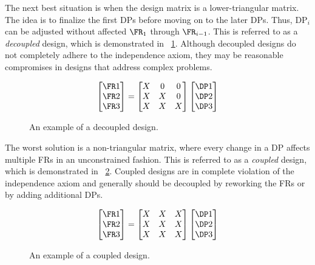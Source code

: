 The next best situation is when the design matrix is a lower-triangular matrix.  The idea is to finalize the first
DPs before moving on to the later DPs.  Thus, \(\text{DP}_i\) can be adjusted without affected \(\FR_1\) through
\(\FR_{i-1}\).  This is referred to as a \emph{decoupled} design, which is demonstrated in
\figurename~\ref{fig:decoupled}.  Although decoupled designs do not completely adhere to the independence axiom,
they may be reasonable compromises in designs that address complex problems.

\begin{figure}[H]
  \begin{equation*}
    \begin{bmatrix}
      \FR1 \\ \FR2 \\ \FR3
    \end{bmatrix}=\begin{bmatrix}
    X & 0 & 0 \\
    X & X & 0 \\
    X & X & X
    \end{bmatrix}\begin{bmatrix}
      \DP1 \\ \DP2 \\ \DP3
    \end{bmatrix}
  \end{equation*}
  \vspace{-\baselineskip}
  \caption{An example of a decoupled design.}
  \label{fig:decoupled}
\end{figure}

The worst solution is a non-triangular matrix, where every change in a DP affects multiple FRs in an unconstrained
fashion.  This is referred to as a \emph{coupled} design, which is demonstrated in \figurename~\ref{fig:coupled}.
Coupled designs are in complete violation of the independence axiom and generally should be decoupled by reworking
the FRs or by adding additional DPs.

\begin{figure}[H]
  \begin{equation*}
    \begin{bmatrix}
      \FR1 \\ \FR2 \\ \FR3
    \end{bmatrix}=\begin{bmatrix}
    X & X & X \\
    X & X & X \\
    X & X & X
    \end{bmatrix}\begin{bmatrix}
      \DP1 \\ \DP2 \\ \DP3
    \end{bmatrix}
  \end{equation*}
  \vspace{-\baselineskip}
  \caption{An example of a coupled design.}
  \label{fig:coupled}
\end{figure}

